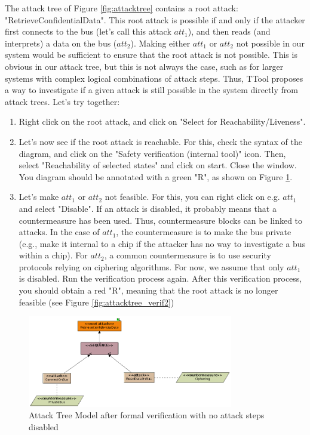 \documentclass[12pt]{article}
\begin{document}
The attack tree of Figure \ref{fig:attacktree} contains a root attack: "RetrieveConfidentialData". This root attack is possible if and only if the attacker first connects to the bus (let's call this attack $att_1$), and then reads (and interprets) a data on the bus ($att_2$). Making either $att_1$ or $att_2$ not possible in our system would be sufficient to ensure that the root attack is not possible. This is obvious in our attack tree, but this is not always the case, such as for larger systems with complex logical combinations of attack steps. Thus, TTool proposes a way to investigate if a given attack is still possible in the system directly from attack trees. Let's try together:
\begin{enumerate}
\item Right click on the root attack, and click on  "Select for Reachability/Liveness".
\item Let's now see if the root attack is reachable. For this, check the syntax of the diagram, and click on the "Safety verification (internal tool)" icon. Then, select "Reachability of selected states" and click on start. Close the window. You diagram should be annotated with a green "R", as shown on Figure \ref{fig:attacktree_verif1}.
\item Let's make $att_1$ or $att_2$ not feasible. For this, you can right click on e.g. $att_1$ and select "Disable". If an attack is disabled, it probably means that a countermeasure has been used. Thus, countermeasure blocks can be linked to attacks. In the case of $ att_1$, the countermeasure is to make the bus private (e.g., make it internal to a chip if the attacker has no way to investigate a bus within a chip). For $att_2$, a common countermeasure is to use security protocols relying on ciphering algorithms. For now, we assume that only $att_1$ is disabled. Run the verification process again. After this verification process, you should obtain a red "R", meaning that the root attack is no longer feasible (see Figure \ref{fig:attacktree_verif2})
 \end{enumerate}


\begin{figure}[htbp]
\centering
\includegraphics[width=0.8\textwidth]{fig/attacktree_verif1.png}
\caption{Attack Tree Model after formal verification with no attack steps disabled} \label{fig:attacktree_verif1}
\end{figure}
\end{document}
